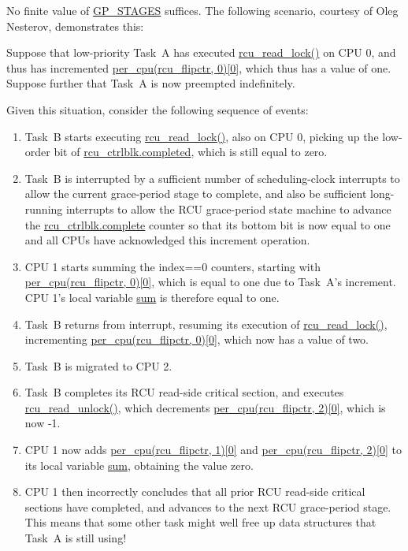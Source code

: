 
No finite value of \url{GP_STAGES} suffices.
The following scenario, courtesy of Oleg Nesterov, demonstrates this:

Suppose that low-priority Task~A has executed
\url{rcu_read_lock()} on CPU 0,
and thus has incremented \url{per_cpu(rcu_flipctr, 0)[0]},
which thus has a value of one.
Suppose further that Task~A is now preempted indefinitely.

Given this situation, consider the following sequence of events:
\begin{enumerate}
\item	Task~B starts executing \url{rcu_read_lock()}, also on
	CPU 0, picking up the low-order bit of
	\url{rcu_ctrlblk.completed}, which is still equal to zero.
\item	Task~B is interrupted by a sufficient number of scheduling-clock
	interrupts to allow the current grace-period stage to complete,
	and also be sufficient long-running interrupts to allow the
	RCU grace-period state machine to advance the
	\url{rcu_ctrlblk.complete} counter so that its bottom bit
	is now equal to one and all CPUs have acknowledged this increment
	operation.
\item	CPU 1 starts summing the index==0 counters, starting with
	\url{per_cpu(rcu_flipctr, 0)[0]}, which is equal to one
	due to Task~A's increment.
	CPU 1's local variable \url{sum} is therefore equal to one.
\item	Task~B returns from interrupt, resuming its execution of
	\url{rcu_read_lock()}, incrementing
	\url{per_cpu(rcu_flipctr, 0)[0]}, which now has a value
	of two.
\item	Task~B is migrated to CPU 2.
\item	Task~B completes its RCU read-side critical section, and executes
	\url{rcu_read_unlock()}, which decrements
	\url{per_cpu(rcu_flipctr, 2)[0]}, which is now -1.
\item	CPU 1 now adds \url{per_cpu(rcu_flipctr, 1)[0]} and 
	\url{per_cpu(rcu_flipctr, 2)[0]} to its
	local variable \url{sum}, obtaining the value zero.
\item	CPU 1 then incorrectly concludes that all prior RCU read-side
	critical sections have completed, and advances to the next
	RCU grace-period stage.
	This means that some other task might well free up data structures
	that Task~A is still using!
\end{enumerate}

